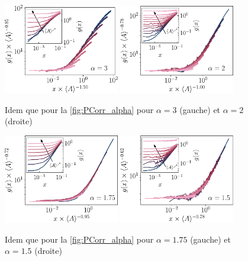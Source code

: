 \begin{figure}[h]
\centering
\includegraphics[width=0.45\textwidth]{Chapitre3/Figures/Interpretation/PCorr/PCorr_rescaled_alpha3_mean.pdf}
\includegraphics[width=0.45\textwidth]{Chapitre3/Figures/Interpretation/PCorr/PCorr_rescaled_alpha2_mean.pdf}
\caption{Idem que pour la \autoref{fig:PCorr_alpha} pour $\alpha = 3$ (gauche) et $\alpha = 2$ (droite)}
\label{fig:PCorrAnnexe5}
\end{figure}

\begin{figure}[h]
\centering
\includegraphics[width=0.45\textwidth]{Chapitre3/Figures/Interpretation/PCorr/PCorr_rescaled_alpha175_mean.pdf}
\includegraphics[width=0.45\textwidth]{Chapitre3/Figures/Interpretation/PCorr/PCorr_rescaled_alpha15_mean.pdf}
\caption{Idem que pour la \autoref{fig:PCorr_alpha} pour $\alpha = 1.75$ (gauche) et $\alpha = 1.5$ (droite)}
\label{fig:PCorrAnnexe5}
\end{figure}

